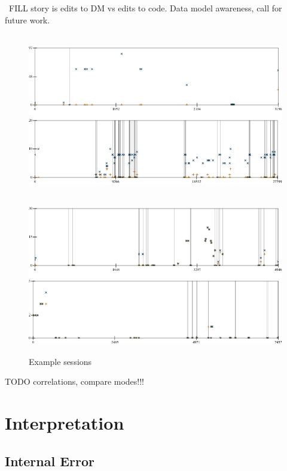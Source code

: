 \documentclass[english,submission,cleveref]{programming}
\begin{document}
~FILL story is edits to DM vs edits to code.
Data model awareness, call for future work.

\begin{figure}[t]\centering
  \mnonstrict{}\\
  \includegraphics[width=\columnwidth]{img/timeline-nonstrict.pdf}

  \medskip{}
  \mstrict{}\\
  \includegraphics[width=\columnwidth]{img/timeline-strict.pdf}

  \caption{Example sessions}
  \label{f:indy-session}
\end{figure}

TODO correlations, compare modes!!!


\section{Interpretation}

\subsection{Internal Error}
\end{document}
